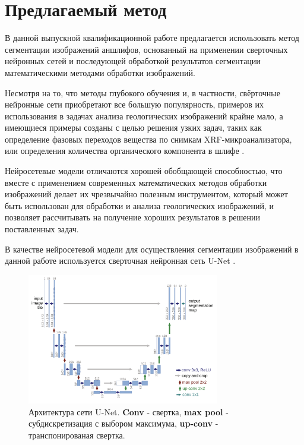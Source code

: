 \section{Предлагаемый метод}
В данной выпускной квалификационной работе предлагается использовать метод сегментации изображений аншлифов, основанный на применении сверточных нейронных сетей и последующей обработкой результатов сегментации математическими методами обработки изображений. \par Несмотря на то, что методы глубокого обучения и, в частности, свёрточные нейронные сети приобретают все большую популярность,  примеров их использования в задачах анализа геологических изображений крайне мало, а имеющиеся примеры созданы с целью решения узких задач, таких как определение фазовых переходов вещества по снимкам XRF-микроанализатора, или определения количества органического компонента в шлифе \cite{osnkonstrmeh, disser1}. \par Нейросетевые модели отличаются хорошей обобщающей способностью, что вместе с применением современных математических методов обработки изображений делает их чрезвычайно полезным инструментом, который может быть использован для обработки и анализа геологических изображений, и позволяет рассчитывать на получение хороших результатов в решении поставленных задач.
\par В качестве нейросетевой модели для осуществления сегментации изображений в данной работе используется сверточная нейронная сеть U-Net \cite{ronneberger2015u}.
\newline
\begin{figure}[H]
    \centering
    \includegraphics[width=0.75\textwidth]{pics/u-net.png}
    \caption{Архитектура сети U-Net. \textbf{Conv} - свертка, \textbf{max pool} - субдискретизация с выбором максимума, \textbf{up-conv} - транспонированая свертка.}
    \label{fig:unet}
\end{figure}
